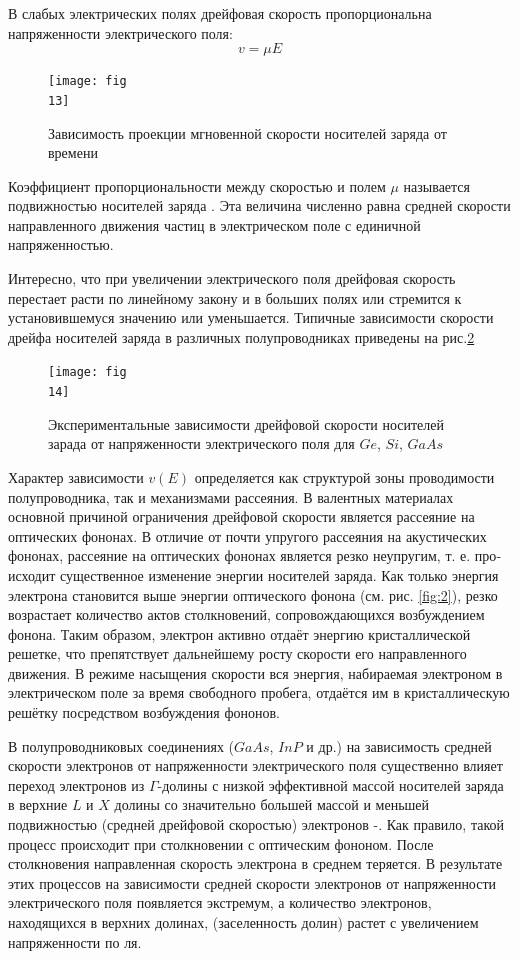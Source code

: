 В слабых электрических полях дрейфовая скорость пропорциональна напряженности электрического поля:
\begin{equation}
\label{eq:1.14}
	v=\mu E
\end{equation}

\begin{figure}[h!]
	\centering
	\texttt{[image: fig\\13]}
	\caption{Зависимость проекции мгновенной скорости носителей заряда от времени}
	\label{fig:3}
\end{figure}

Коэффициент пропорциональности между скоростью и полем $\mu$ называется подвижностью носителей заряда . Эта величина численно равна средней скорости
направленного движения частиц в электрическом поле с единичной напряженностью.

Интересно, что при увеличении электрического поля дрейфовая скорость
перестает расти по линейному закону и в больших полях или стремится к установившемуся значению или уменьшается. Типичные зависимости скорости
дрейфа носителей заряда в различных полупроводниках приведены на рис.\ref{fig:4}

\begin{figure}[h!]
	\centering
	\texttt{[image: fig\\14]}
	\caption{Экспериментальные зависимости дрейфовой скорости носителей зарада от напряженности электрического поля для $Ge$, $Si$, $GaAs$}
	\label{fig:4}
\end{figure}

Характер зависимости $v(E)$ определяется как структурой зоны проводимости полупроводника, так и механизмами рассеяния. В валентных материалах основной причиной ограничения дрейфовой скорости является рассеяние на оптических фононах. В отличие от почти упругого рассеяния на акустических фононах, рассеяние на оптических фононах является резко неупругим, т. е. про­
исходит существенное изменение энергии носителей заряда. Как только энергия
электрона становится выше энергии оптического фонона (см. рис. \ref{fig:2}), резко
возрастает количество актов столкновений, сопровождающихся возбуждением
фонона. Таким образом, электрон активно отдаёт энергию кристаллической
решетке, что препятствует дальнейшему росту скорости его направленного движения. В режиме насыщения скорости вся энергия, набираемая электроном в электрическом поле за время свободного пробега, отдаётся им в кристаллическую решётку посредством возбуждения фононов.

В полупроводниковых соединениях ($GaAs$, $InP$ и др.) на зависимость сред­ней скорости электронов от напряженности электрического поля существенно влияет переход электронов из $\Gamma$-долины с низкой эффективной массой носителей
заряда в верхние $L$ и $X$ долины со значительно большей массой и меньшей подвижностью (средней дрейфовой скоростью) электронов \cite{lit4}-\cite{lit5}. Как правило, такой
процесс происходит при столкновении с оптическим фононом. После столкновения направленная скорость электрона в среднем теряется. В результате этих
процессов на зависимости средней скорости электронов от напряженности электрического поля появляется экстремум, а количество электронов, находящихся в
верхних долинах, (заселенность долин) растет с увеличением напряженности по­
ля.

